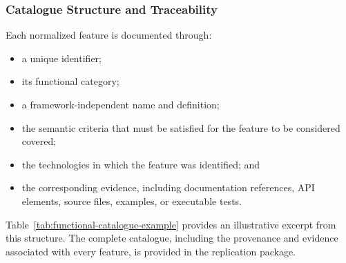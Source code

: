 \subsubsection{Catalogue Structure and Traceability}

Each normalized feature is documented through:

\begin{itemize}
    \item a unique identifier;
    \item its functional category;
    \item a framework-independent name and definition;
    \item the semantic criteria that must be satisfied for the feature to be
    considered covered;
    \item the technologies in which the feature was identified; and
    \item the corresponding evidence, including documentation references, API
    elements, source files, examples, or executable tests.
\end{itemize}

Table~\ref{tab:functional-catalogue-example} provides an illustrative excerpt
from this structure. The complete catalogue, including the provenance and
evidence associated with every feature, is provided in the replication
package.

